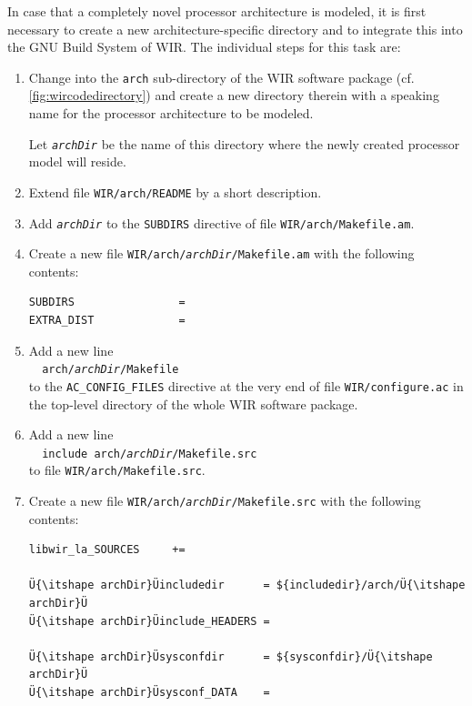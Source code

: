 In case that a completely novel processor architecture is modeled, it is first necessary to create a new architecture-specific directory and to integrate this into the GNU Build System of \gls{WIR}.
The individual steps for this task are:
\begin{enumerate}
  \item Change into the \texttt{arch} sub-directory of the \gls{WIR} software package (cf. \cref{fig:wircodedirectory}) and create a new directory therein with a speaking name for the processor architecture to be modeled.

  \begin{wirNote}
  Let \texttt{\itshape archDir} be the name of this directory where the newly created processor model will reside.
  \end{wirNote}
  \item Extend file \texttt{WIR/arch/README} by a short description.
  \item Add \texttt{\itshape archDir} to the \texttt{SUBDIRS} directive of file \texttt{WIR/arch/Makefile.am}.
  \item Create a new file \texttt{WIR/arch/{\itshape archDir}/Makefile.am} with the following contents: \\
\begin{lstlisting}[style=code,float=h,xleftmargin=10mm,belowskip=-0.8 \baselineskip]
SUBDIRS                =
EXTRA_DIST             =
\end{lstlisting}
  \item Add a new line \\
  \verb|  arch/|\texttt{\itshape archDir}\verb|/Makefile| \\
  to the \texttt{AC\_CONFIG\_FILES} directive at the very end of file \texttt{WIR/configure.ac} in the top-level directory of the whole \gls{WIR} software package.
  \item Add a new line \\
  \verb|  include arch/|\texttt{\itshape archDir}\verb|/Makefile.src| \\
  to file \texttt{WIR/arch/Makefile.src}.
  \item Create a new file \texttt{WIR/arch/{\itshape archDir}/Makefile.src} with the following contents:
\begin{lstlisting}[style=code,float=h,xleftmargin=10mm,belowskip=-0.8 \baselineskip]
libwir_la_SOURCES     +=

Ü{\itshape archDir}Üincludedir      = ${includedir}/arch/Ü{\itshape archDir}Ü
Ü{\itshape archDir}Üinclude_HEADERS =

Ü{\itshape archDir}Üsysconfdir      = ${sysconfdir}/Ü{\itshape archDir}Ü
Ü{\itshape archDir}Üsysconf_DATA    =
\end{lstlisting}
\end{enumerate}

